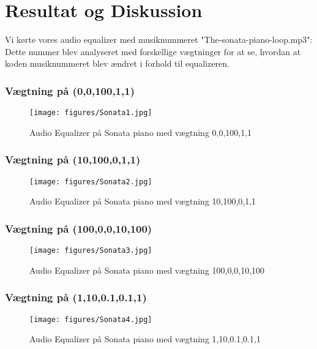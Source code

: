\chapter{Resultat og Diskussion}\label{ch:Resultat og Diskussion}

Vi kørte vores audio equalizer med musiknummeret "The-sonata-piano-loop.mp3":
Dette nummer blev analyseret med forskellige vægtninger for at se, hvordan at koden musiknummeret blev ændret i forhold til equalizeren.



\subsection{Vægtning på (0,0,100,1,1)}

\begin{figure}[H]
	\centering
	\texttt{[image: figures/Sonata1.jpg]}
	\caption{Audio Equalizer på Sonata piano med vægtning 0,0,100,1,1}
	\label{fig:Sonata1}
\end{figure}



\subsection{Vægtning på (10,100,0,1,1)}

\begin{figure}[H]
	\centering
	\texttt{[image: figures/Sonata2.jpg]}
	\caption{Audio Equalizer på Sonata piano med vægtning 10,100,0,1,1}
	\label{fig:Sonata2}
\end{figure}


\subsection{Vægtning på (100,0,0,10,100)}

\begin{figure}[H]
	\centering
	\texttt{[image: figures/Sonata3.jpg]}
	\caption{Audio Equalizer på Sonata piano med vægtning 100,0,0,10,100}
	\label{fig:Sonata3}
\end{figure}


\subsection{Vægtning på (1,10,0.1,0.1,1)}

\begin{figure}[H]
	\centering
	\texttt{[image: figures/Sonata4.jpg]}
	\caption{Audio Equalizer på Sonata piano med vægtning 1,10,0.1,0.1,1}
	\label{fig:Sonata4}
\end{figure}
